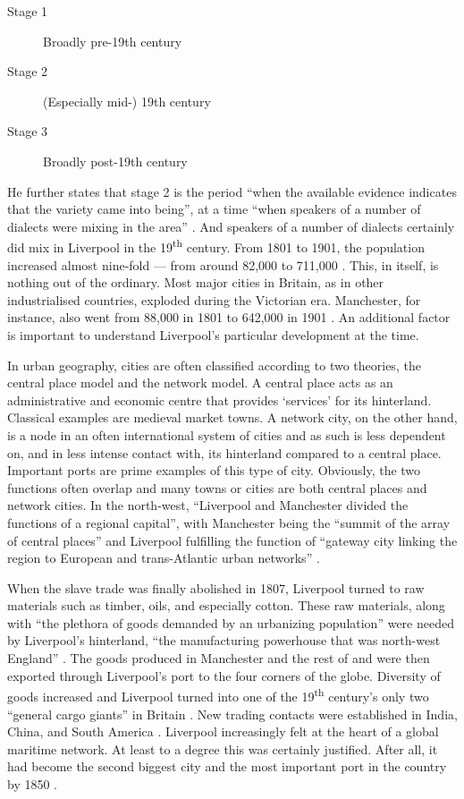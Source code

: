 	\begin{description}
		\item[Stage 1] Broadly pre-19th century
		\item[Stage 2] (Especially mid-) 19th century
		\item[Stage 3] Broadly post-19th century
	\end{description}

He further states that stage 2 is the period ``when the available evidence indicates that the variety came into being'', at a time ``when speakers of a number of dialects were mixing in the area'' \parencite[106--107]{honeybone2007}.
And speakers of a number of dialects certainly did mix in Liverpool in the 19\textsuperscript{th} century.
From 1801 to 1901, the population increased almost nine-fold --- from around 82,000 to 711,000 \parencite{gbhistgis}.
This, in itself, is nothing out of the ordinary.
Most major cities in Britain, as in other industrialised countries, exploded during the Victorian era.
Manchester, for instance, also went from 88,000 in 1801 to 642,000 in 1901 \parencite{gbhistgis}.
An additional factor is important to understand Liverpool's particular development at the time.

In urban geography, cities are often classified according to two theories, the central place model and the network model.
A central place acts as an administrative and economic centre that provides `services' for its hinterland. Classical examples are medieval market towns.
A network city, on the other hand, is a node in an often international system of cities and as such is less dependent on, and in less intense contact with, its hinterland compared to a central place.
Important ports are prime examples of this type of city.
Obviously, the two functions often overlap and many towns or cities are both central places and network cities.
In the north-west, ``Liverpool and Manchester divided the functions of a regional capital'', with Manchester being the ``summit of the array of central places'' and Liverpool fulfilling the function of ``gateway city linking the region to European and trans-Atlantic urban networks'' \citep[188--189]{hohenberglees1985}.

When the slave trade was finally abolished in 1807, Liverpool turned to raw materials such as timber, oils, and especially cotton.
These raw materials, along with ``the plethora of goods demanded by an urbanizing population'' were needed by Liverpool's hinterland, ``the manufacturing powerhouse that was north-west England'' \parencite[258]{milne2006}.
The goods produced in Manchester and the rest of  and  were then exported through Liverpool's port to the four corners of the globe.
Diversity of goods increased and Liverpool turned into one of the 19\textsuperscript{th} century's only two ``general cargo giants'' in Britain \parencite[259]{milne2006}.
New trading contacts were established in India, China, and South America .
Liverpool increasingly felt at the heart of a global maritime network.
At least to a degree this was certainly justified.
After all, it had become the second biggest city and the most important port in the country by 1850 \citep[cf.][113--114]{honeybone2007}.

